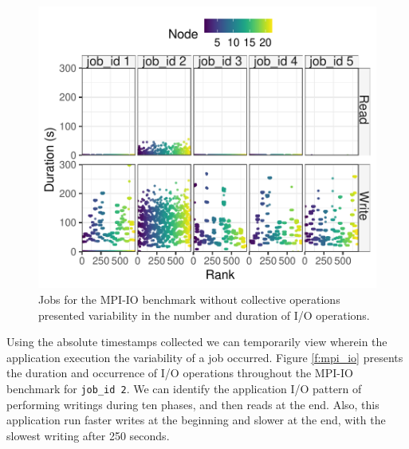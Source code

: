 \begin{figure}
	\centering
        \includegraphics[width=\linewidth]{figs/mpi_io_luster_no_coll_duration_allexperiments.pdf}
	\caption{Jobs for the MPI-IO benchmark without collective
          operations presented variability in the number and duration
          of I/O operations.}
	\label{f:mpi_io_all}
\end{figure}

Using the absolute timestamps collected we can temporarily view
wherein the application execution the variability of a job
occurred. Figure \ref{f:mpi_io} presents the duration and occurrence of
I/O operations throughout the MPI-IO benchmark for \texttt{job\_id
  2}. We can identify the application I/O pattern of performing
writings during ten phases, and then reads at the end. Also, this
application run faster writes at the beginning and slower at the end,
with the slowest writing after 250 seconds.
      

